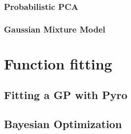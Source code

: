 \subsubsection{Probabilistic PCA}

\subsubsection{Gaussian Mixture Model}


\section{Function fitting}
\subsection{Fitting a GP with Pyro}

\subsection{Bayesian Optimization}






